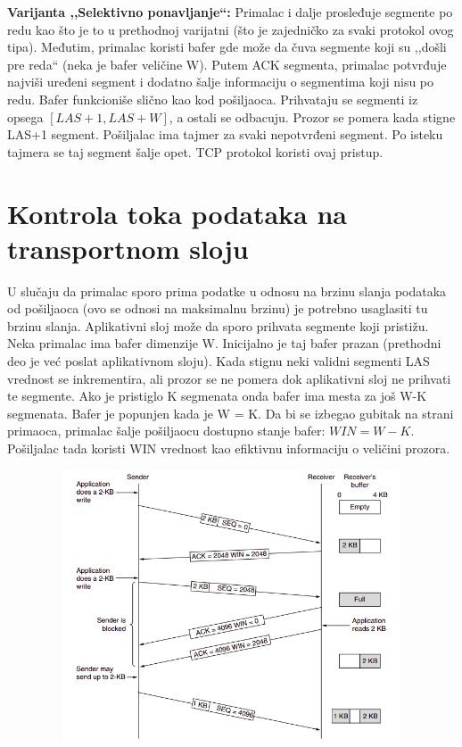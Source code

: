 \documentclass[a4paper]{article}
\begin{document}
        \textbf{Varijanta ,,Selektivno ponavljanje``:} Primalac i dalje prosleđuje 
        segmente po redu kao što je to u prethodnoj varijatni (što je zajedničko za svaki 
        protokol ovog tipa). Međutim, primalac koristi bafer gde može da čuva segmente
        koji su ,,došli pre reda`` (neka je bafer veličine W). Putem ACK segmenta, primalac
        potvrđuje najviši uređeni segment i dodatno šalje informaciju o segmentima koji nisu po redu.
        Bafer funkcioniše slično kao kod pošiljaoca. Prihvataju se segmenti iz
        opsega $[LAS+1, LAS+W]$, a ostali se odbacuju. Prozor se pomera kada stigne LAS+1 segment. 
        Pošiljalac ima tajmer za svaki nepotvrđeni segment. Po isteku tajmera se taj segment šalje opet.
        TCP protokol koristi ovaj pristup. 

\section{Kontrola toka podataka na transportnom sloju}
    U slučaju da primalac sporo prima podatke u odnosu na brzinu slanja podataka od pošiljaoca (ovo 
    se odnosi na maksimalnu brzinu) je potrebno usaglasiti tu brzinu slanja. Aplikativni sloj može da
    sporo prihvata segmente koji pristižu. \\
    \indent Neka primalac ima bafer dimenzije W. Inicijalno je taj bafer prazan (prethodni deo
    je već poslat aplikativnom sloju). Kada stignu neki validni segmenti LAS vrednost se inkrementira,
    ali prozor se ne pomera dok aplikativni sloj ne prihvati te segmente. Ako je pristiglo K
    segmenata onda bafer ima mesta za još W-K segmenata. Bafer je popunjen kada je W = K. Da bi se
    izbegao gubitak na strani primaoca, primalac šalje pošiljaocu dostupno stanje bafer: 
    $WIN = W - K$. Pošiljalac tada koristi WIN vrednost kao efiktivnu informaciju o veličini prozora.
    \begin{figure}[H]
        \begin{center}
            \includegraphics[width=120mm,height=80mm]{Slike/kontrola_toka.png}
        \end{center}
    \end{figure}
\end{document}
